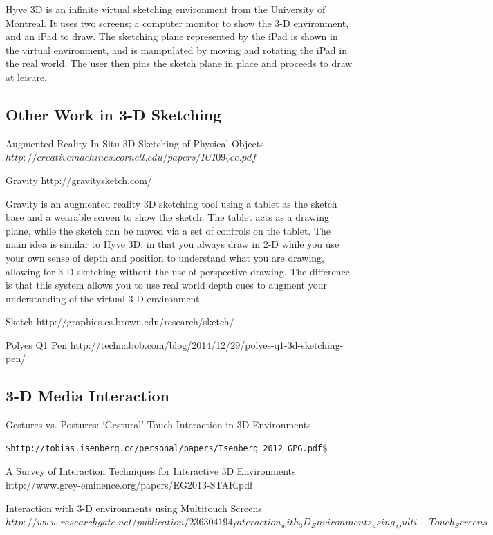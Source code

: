 \documentclass{article}
\begin{document}
Hyve 3D is an infinite virtual sketching environment from the University of Montreal. It uses two screens; a computer monitor to show the 3-D environment, and an iPad to draw. The sketching plane represented by the iPad is shown in the virtual environment, and is manipulated by moving and rotating the iPad in the real world. The user then pins the sketch plane in place and proceeds to draw at leisure.



\subsection{Other Work in 3-D Sketching}

Augmented Reality In-Situ 3D Sketching of Physical Objects $http://creativemachines.cornell.edu/papers/IUI09_Yee.pdf$

Gravity http://gravitysketch.com/

Gravity is an augmented reality 3D sketching tool using a tablet as the sketch base and a wearable screen to show the sketch. The tablet acts as a drawing plane, while the sketch can be moved via a set of controls on the tablet. The main idea is similar to Hyve 3D, in that you always draw in 2-D while you use your own sense of depth and position to understand what you are drawing, allowing for 3-D sketching without the use of perspective drawing. The difference is that this system allows you to use real world depth cues to augment your understanding of the virtual 3-D environment.

Sketch http://graphics.cs.brown.edu/research/sketch/

Polyes Q1 Pen http://technabob.com/blog/2014/12/29/polyes-q1-3d-sketching-pen/

\subsection{3-D Media Interaction}

Gestures vs. Postures: ‘Gestural’ Touch Interaction in 3D Environments 

\begin{verbatim}
$http://tobias.isenberg.cc/personal/papers/Isenberg_2012_GPG.pdf$
\end{verbatim}
A Survey of Interaction Techniques for Interactive 3D Environments http://www.grey-eminence.org/papers/EG2013-STAR.pdf

Interaction with 3-D environments using Multitouch Screens $http://www.researchgate.net/publication/236304194_Interaction_with_3D_Environments_using_Multi-Touch_Screens$
\end{document}
